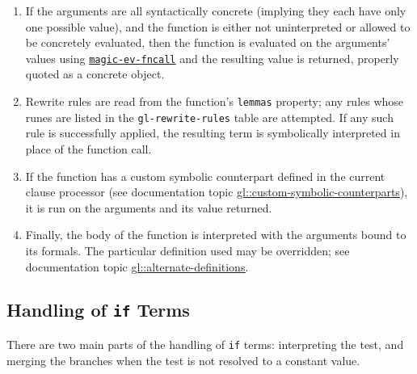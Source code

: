 \documentclass[submission,copyright,creativecommons]{eptcs}
\begin{document}
\begin{enumerate}
\item If the arguments are all syntactically concrete (implying they
  each have only one possible value), and the function is either not
  uninterpreted or allowed to be concretely evaluated, then the
  function is evaluated on the arguments' values using \href{http://www.cs.utexas.edu/users/moore/acl2/manuals/current/manual/?topic=ACL2____MAGIC-EV-FNCALL}{\underline{\texttt{magic-ev-fncall}}} and the resulting value is returned, properly quoted as a concrete object.
\item Rewrite rules are read from the function's \texttt{lemmas}
  property; any rules whose runes are listed in the
  \texttt{gl-rewrite-rules} table are attempted.  If any such rule is
  successfully applied, the resulting term is symbolically interpreted
  in place of the function call.
\item If the function has a custom symbolic counterpart defined in the
  current clause processor \cite{gl-diss} (see documentation topic
  \href{http://www.cs.utexas.edu/users/moore/acl2/manuals/current/manual/?topic=GL____CUSTOM-SYMBOLIC-COUNTERPARTS}{\underline{gl::custom-symbolic-counterparts}}),
  it is run on the arguments and its value returned.
\item Finally, the body of the function is interpreted with the
  arguments bound to its formals.  The particular definition used may
  be overridden; see documentation topic
  \href{http://www.cs.utexas.edu/users/moore/acl2/manuals/current/manual/?topic=GL____ALTERNATE-DEFINITIONS}{\underline{gl::alternate-definitions}}.
\end{enumerate}

\subsection{Handling of \texttt{if} Terms}

There are two main parts of the handling of \texttt{if} terms:
interpreting the test, and merging the branches when the test is not
resolved to a constant value.
\end{document}
